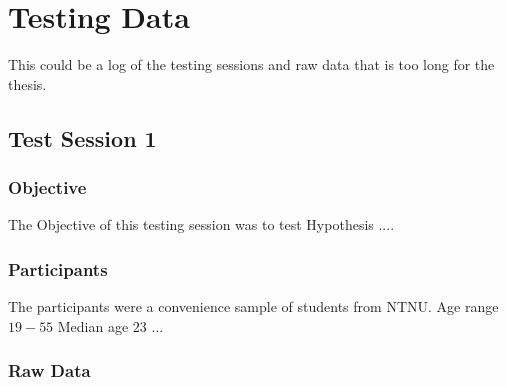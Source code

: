 \chapter{Testing Data}
This could be a log of the testing sessions and raw data that is too long for the thesis.
\section{Test Session 1}
\subsection*{Objective}
The Objective of this testing session was to test Hypothesis ....

\subsection*{Participants}
The participants were a convenience sample of students from NTNU. Age range $19-55$ Median age $23$ ...


\subsection{Raw Data}




